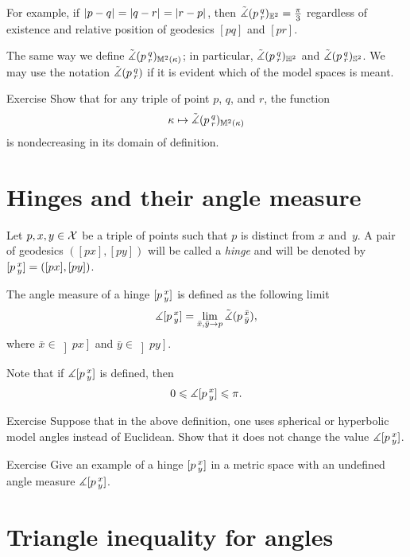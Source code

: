For example, if $|{p}-{q}|_{}^{{}}=|{q}-{r}|_{}^{{}}=|{r}-{p}|_{}^{{}}$, then $\tilde\measuredangle(p\,{}^{q}_{r})_{\mathbb{E}^2}=\tfrac\pi3$ regardless of existence and relative position of geodesics $[pq]$ and $[pr]$.

The same way we define $\tilde\measuredangle(p\,{}^{q}_{r})_{\mathbb{M}^2(\kappa)}$;
in particular, $\tilde\measuredangle(p\,{}^{q}_{r})_{\mathbb{H}^2}$ and $\tilde\measuredangle(p\,{}^{q}_{r})_{\mathbb{S}^2}$.
We may use the notation $\tilde\measuredangle(p\,{}^{q}_{r})$ if it is evident which of the model spaces is meant.

\begin{thm}{Exercise}\label{ex:k-><mono}
Show that for any triple of point $p$, $q$, and $r$,
the function
\[\kappa\mapsto \tilde\measuredangle(p\,{}^{q}_{r})_{\mathbb{M}^2(\kappa)}\]
is nondecreasing in its domain of definition.
\end{thm}


\section{Hinges and their angle measure}\label{sec:angles}

 Let $p,x,y\in \mathcal{X}$ be a triple of points such that $p$ is distinct from $x$ and~$y$.
A pair of geodesics $([p x],[p y])$ will be called  a \emph{hinge} and will be denoted by 
$[p\,{}^{x}_{y}]=([p x],[p y])$\index{$\hinge{{*}}{{*}}{{*}}$}.

The angle measure of a hinge $[p\,{}^{x}_{y}]$ is defined as the following limit
\[\measuredangle[p\,{}^{x}_{y}]=\lim_{\bar x,\bar y\to p} \tilde\measuredangle(p\,{}^{\bar x}_{\bar y}),\]
where $\bar x\in\left]p x\right]$ and $\bar y\in\left]p y\right]$.

Note that if $\measuredangle[p\,{}^{x}_{y}]$ is defined, then
\[0\leqslant \measuredangle[p\,{}^{x}_{y}]\leqslant \pi.\]

\begin{thm}{Exercise}\label{ex:angkK}
Suppose that in the above definition, one uses spherical or hyperbolic model angles instead of Euclidean.
Show that it does not change the value $\measuredangle[p\,{}^{x}_{y}]$.
\end{thm}


\begin{thm}{Exercise}\label{ex:undefined-angle}
Give an example of a hinge $[p\,{}^{x}_{y}]$ in a metric space with an undefined angle measure $\measuredangle[p\,{}^{x}_{y}]$.
\end{thm}

\section{Triangle inequality for angles}

